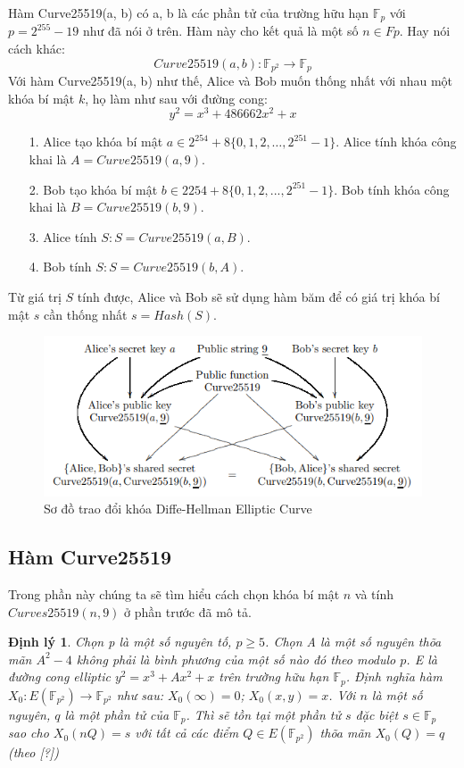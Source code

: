 \documentclass[a4paper,12pt]{report}
\newtheorem{theorem}{Định lý}[chapter]
\begin{document}
Hàm Curve25519(a, b) có a, b là các phần tử của trường hữu hạn $\mathbb{F}_p$ với $p = 2^{255} - 19$ như đã nói ở trên. Hàm này cho kết quả là một số $n \in Fp$. Hay nói cách khác:
\begin{displaymath}
Curve25519(a, b): \mathbb{F}_{p^2} \rightarrow \mathbb{F}_p
\end{displaymath}
Với hàm Curve25519(a, b) như thế, Alice và Bob muốn thống nhất với nhau một khóa bí mật $k$, họ làm như sau với đường cong:
\begin{displaymath}
y^2 = x^3 + 486662x^2 + x
\end{displaymath}
\begin{itemize}
\item[1. ] Alice tạo khóa bí mật $a \in 2^{254} + 8\{0, 1, 2, \ldots, 2^{251} - 1\}$. Alice tính khóa công khai là $A = Curve25519(a, 9)$.
\item[2. ] Bob tạo khóa bí mật $b \in 2254 + 8\{0, 1, 2, ..., 2^{251} - 1\}$. Bob tính khóa công khai là $B = Curve25519(b, 9)$.
\item[3. ] Alice tính $S: S = Curve25519(a, B)$.
\item[4. ] Bob tính $S: S = Curve25519(b, A)$.
\end{itemize}
Từ giá trị $S$ tính được, Alice và Bob sẽ sử dụng hàm băm để có giá trị khóa bí mật $s$ cần thống nhất $s = Hash(S)$.
\begin{center}
\begin{figure}[H]
\centering
\includegraphics[width=0.85\linewidth]{../im23.png}
\caption{Sơ đồ trao đổi khóa Diffe-Hellman Elliptic Curve}
\end{figure}
\end{center}
\subsection*{Hàm Curve25519}
Trong phần này chúng ta sẽ tìm hiểu cách chọn khóa bí mật $n$ và tính $Curves25519(n, 9)$ ở phần trước đã mô tả.
\begin{theorem} \label{dl4.1}
Chọn p là một số nguyên tố, $p \geq 5$. Chọn A là một số nguyên thõa mãn $A^2 - 4$ không phải là bình phương của một số nào đó theo modulo $p$. E là đường cong elliptic $y^2 = x^3 + Ax^2 + x$ trên trường hữu hạn $\mathbb{F}_p$. Định nghĩa hàm $X_0 : E(\mathbb{F}_{p^2} ) \rightarrow  \mathbb{F}_{p^2}$ như sau: $X_0(\infty) = 0$; $X_0(x, y) = x$. Với $n$ là một số nguyên, $q$ là một phần tử của $\mathbb{F}_p$. Thì sẽ tồn tại một phần tử $s$ đặc biệt $s \in \mathbb{F}_p$ sao cho $X_0(nQ) = s$ với tất cả các điểm $Q \in E(\mathbb{F}_{p^2} )$ thõa mãn $X_0(Q) = q$ (theo [?])
\end{theorem}
\end{document}

